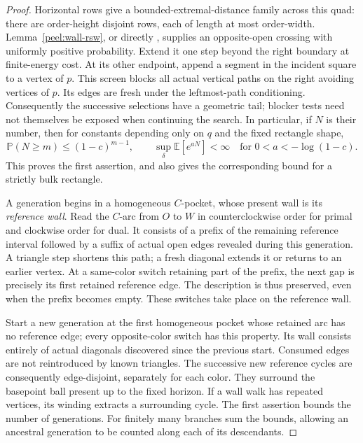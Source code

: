 \begin{proof}
Horizontal rows give a bounded-extremal-distance family across this
quad: there are order-height disjoint rows, each of length at most
order-width.  Lemma~\ref{peel:wall-rsw}, or directly
\citet[Theorem~1.2]{DMT2021Fractal}, supplies an opposite-open crossing
with uniformly positive probability.  Extend it one step beyond the
right boundary at finite-energy cost.  At its other endpoint, append
a segment in the incident square to a vertex of $p$.  This screen
blocks all actual vertical paths on the right avoiding vertices of
$p$.  Its edges are fresh under the leftmost-path conditioning.
Consequently the successive selections have a geometric tail; blocker
tests need not themselves be exposed when continuing the search.
In particular, if $N$ is their number, then for constants depending
only on $q$ and the fixed rectangle shape,
\begin{equation}\label{peel:passage-tail}
 \mathbb P(N\ge m)\le(1-c)^{m-1},\qquad
 \sup_{\delta}\mathbb E[e^{aN}]<\infty
 \quad\text{for }0<a<-\log(1-c).
\end{equation}
This proves the first assertion, and also gives the corresponding
bound for a strictly bulk rectangle.

A generation begins in a homogeneous $C$-pocket, whose present wall is
its \emph{reference wall}.  Read the $C$-arc from $O$ to $W$ in
counterclockwise order for primal and clockwise order for dual.  It
consists of a prefix of the remaining reference interval followed by
a suffix of actual open edges revealed during this generation.  A
triangle step shortens this path; a fresh diagonal extends it or
returns to an earlier vertex.  At a same-color switch retaining part
of the prefix, the next gap is precisely its first retained reference
edge.  The description is thus preserved, even when the prefix becomes
empty.  These switches take place on the reference wall.

Start a new generation at the first homogeneous pocket whose retained
arc has no reference edge; every opposite-color switch has this
property.  Its wall consists entirely of actual diagonals discovered
since the previous start.  Consumed edges are not reintroduced by
known triangles.  The successive new reference cycles are consequently
edge-disjoint, separately for each color.  They surround the basepoint
ball present up to the fixed horizon.  If a wall walk has repeated
vertices, its winding extracts a surrounding cycle.  The first
assertion bounds the number of generations.  For finitely many
branches sum the bounds, allowing an ancestral generation to be
counted along each of its descendants.
\end{proof}

